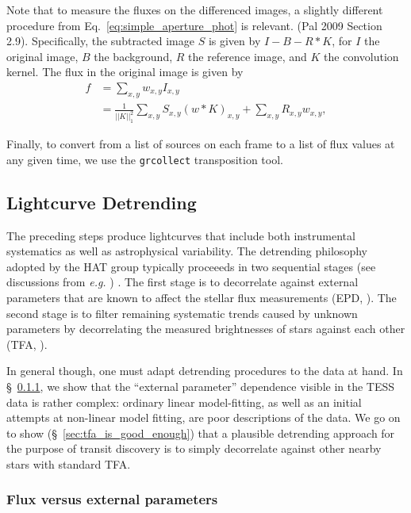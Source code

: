 \documentclass[12pt,twocolumn,tighten]{aastex62}
\begin{document}
Note that to measure the fluxes on the differenced images, a
slightly different procedure from Eq.~\ref{eq:simple_aperture_phot} is
relevant.
(Pal 2009 Section 2.9).
Specifically, the subtracted image $S$ is given by $I - B - R\ast K$,
for $I$ the original image, $B$ the background, $R$ the reference
image, and $K$ the convolution kernel.
The flux in the original image is given by
\begin{align}
  f &= \sum_{x,y} w_{x,y} I_{x,y} \\
    &= 
       \frac{1}{|| K ||_1^2} \sum_{x,y} S_{x,y} (w \ast K)_{x,y}
       +
       \sum_{x,y} R_{x,y} w_{x,y},
\end{align}

Finally, to convert from a list of sources on each frame to a list of
flux values at any given time, we use the \texttt{grcollect}
transposition tool.

\subsection{Lightcurve Detrending}
\label{subsec:lcdetrending}

The preceding steps produce lightcurves that include both instrumental
systematics as well as astrophysical variability.  The detrending
philosophy adopted by the HAT group typically proceeeds in two
sequential stages (see discussions from {\it e.g.}
\citealt{bakos_2010,huang_high-precision_2015,zhang_precision_2016}) .
The first stage is to decorrelate against external parameters that are
known to affect the stellar flux measurements (EPD,
\citealt{bakos_2010}). The second stage is to filter remaining
systematic trends caused by unknown parameters by decorrelating the
measured brightnesses of stars against each other (TFA,
\citealt{kovacs_trend_2005}).  

In general though, one must adapt detrending procedures to the data at
hand.  In \S~\ref{sec:flux_vs_external_parameters}, we show that the
``external parameter'' dependence visible in the TESS data is rather
complex: ordinary linear model-fitting, as well as an initial attempts
at non-linear model fitting, are poor descriptions of the data.  We go
on to show (\S~\ref{sec:tfa_is_good_enough}) that a plausible
detrending approach for the purpose of transit discovery is to simply
decorrelate against other nearby stars with standard TFA.


\subsubsection{Flux versus external parameters}
\label{sec:flux_vs_external_parameters}
\end{document}
